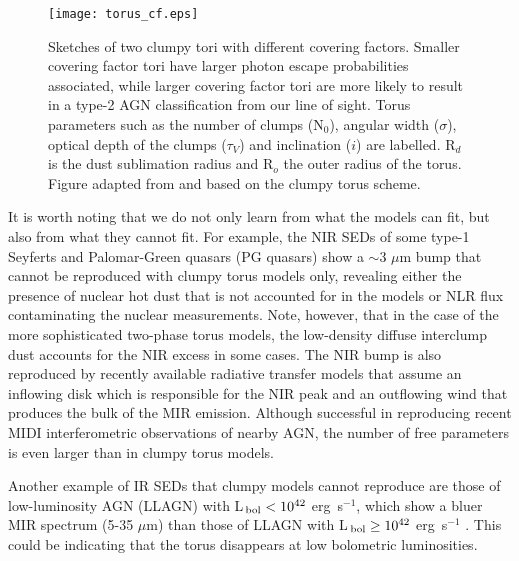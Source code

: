 \documentclass{natureprintstyle}
\def\micron{$\mu$m}
\begin{document}



\begin{figure*}
\centering
\texttt{[image: torus\_cf.eps]}
\caption{{Sketches of two clumpy tori with different covering factors.} Smaller covering factor tori have larger photon escape probabilities associated, while larger covering factor tori are more likely to result in a type-2 AGN classification from our line of sight. Torus parameters such as the number of clumps (N$_0$), angular width ($\sigma$), optical depth of the clumps ($\tau_V$) and inclination ($i$) are labelled. R$_d$ is the dust sublimation radius and R$_o$ the outer radius of the torus.
Figure adapted from \cite{Ramos14} and based on the clumpy torus scheme\cite{Nenkova08a}.}
\label{torus}
\end{figure*}


It is worth noting that we do not only learn from what the models can fit, but also from what they cannot fit. For example, the NIR SEDs of some type-1 Seyferts and 
Palomar-Green quasars (PG quasars) show a $\sim$3 $\mu$m bump that cannot be reproduced with clumpy torus models only, revealing either the presence of nuclear hot dust that is not accounted for in the models or NLR flux contaminating the nuclear measurements\cite{Mor09,Alonso11}. Note, however, that in the case of the more sophisticated two-phase torus models\cite{Stalevski12}, the low-density diffuse interclump dust accounts for the NIR excess in some cases\cite{Lira13,Roseboom13}. {The NIR bump is also reproduced by recently available radiative transfer models\cite{Honig17} that assume an inflowing disk which is responsible for the NIR peak and an outflowing wind that produces the bulk of the MIR emission. Although successful in reproducing recent MIDI interferometric observations of nearby AGN\cite{Lopez16}, the number of free parameters is even larger than in clumpy torus models.}

Another example of IR SEDs that clumpy models cannot reproduce are those of {low-luminosity AGN (LLAGN) with L$_{\rm\,bol} < 10^{42}$ erg~s$^{-1}$, which show a {bluer MIR spectrum (5-35 \micron)} than those of LLAGN with L$_{\rm\,bol} \ge 10^{42}$ erg~s$^{-1}$} \cite{Gonzalez15}. This could be indicating that the torus disappears at low bolometric luminosities\cite{Elitzur:2009hh}.
\end{document}
